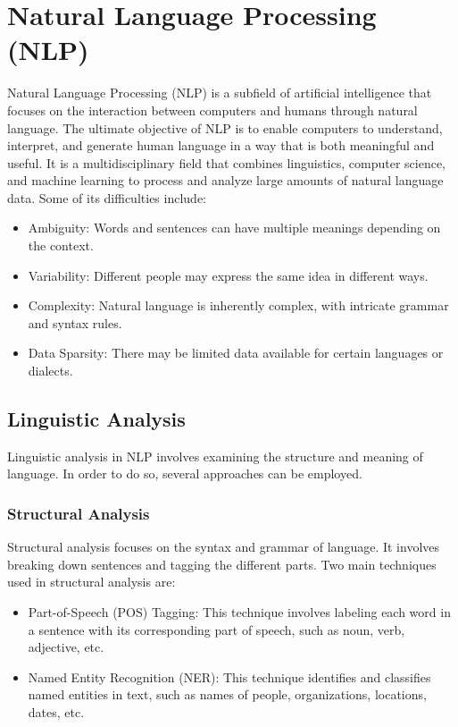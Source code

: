 \chapter{Natural Language Processing (NLP)}

Natural Language Processing (NLP) is a subfield of artificial intelligence that focuses on the interaction between computers and humans through natural language. The ultimate objective of NLP is to enable computers to understand, interpret, and generate human language in a way that is both meaningful and useful. It is a multidisciplinary field that combines linguistics, computer science, and machine learning to process and analyze large amounts of natural language data. Some of its difficulties include:
\begin{itemize}
    \item Ambiguity: Words and sentences can have multiple meanings depending on the context.
    \item Variability: Different people may express the same idea in different ways.
    \item Complexity: Natural language is inherently complex, with intricate grammar and syntax rules.
    \item Data Sparsity: There may be limited data available for certain languages or dialects.
\end{itemize}

\section{Linguistic Analysis}

Linguistic analysis in NLP involves examining the structure and meaning of language. In order to do so, several approaches can be employed.

\subsection{Structural Analysis}

Structural analysis focuses on the syntax and grammar of language. It involves breaking down sentences and tagging the different parts. Two main techniques used in structural analysis are:
\begin{itemize}
    \item Part-of-Speech (POS) Tagging: This technique involves labeling each word in a sentence with its corresponding part of speech, such as noun, verb, adjective, etc.
    \item Named Entity Recognition (NER): This technique identifies and classifies named entities in text, such as names of people, organizations, locations, dates, etc.
\end{itemize}

